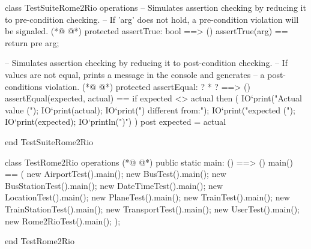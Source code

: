 \begin{vdmpp}[breaklines=true]
class TestSuiteRome2Rio
operations
   -- Simulates assertion checking by reducing it to pre-condition checking.
   -- If 'arg' does not hold, a pre-condition violation will be signaled.
(*@
\label{assertTrue:5}
@*)
   protected assertTrue: bool ==> ()
    assertTrue(arg) == 
   return 
   pre arg;
   
   -- Simulates assertion checking by reducing it to post-condition checking.
   -- If values are not equal, prints a message in the console and generates 
   -- a post-conditions violation.
(*@
\label{assertEqual:13}
@*)
   protected assertEqual: ? * ? ==> ()
    assertEqual(expected, actual) == 
    if expected <> actual then (
      IO`print("Actual value (");
      IO`print(actual); 
      IO`print(") different from:\n");
      IO`print("expected (");
      IO`print(expected);
      IO`println(")\n")
    )
    post expected = actual


end TestSuiteRome2Rio

class TestRome2Rio
 operations
(*@
\label{main:30}
@*)
   public static main: () ==> ()
      main() ==
      (
       new AirportTest().main();
       new BusTest().main();
       new BusStationTest().main();
       new DateTimeTest().main();
       new LocationTest().main();
       new PlaneTest().main();
       new TrainTest().main();
       new TrainStationTest().main();
       new TransportTest().main();
       new UserTest().main();
       new Rome2RioTest().main();
      );

end TestRome2Rio
\end{vdmpp}
